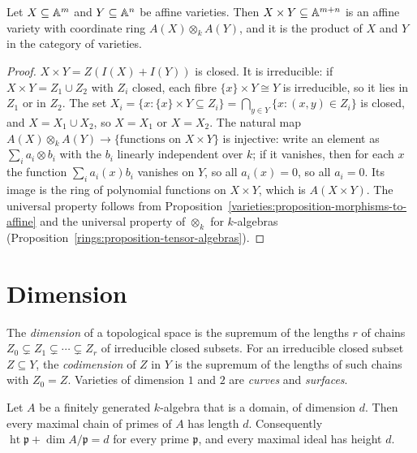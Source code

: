\begin{proposition}\label{varieties:proposition-products-affine}
Let $X \subseteq \mathbb{A}^m$ and $Y \subseteq \mathbb{A}^n$ be affine varieties. Then $X \times Y \subseteq \mathbb{A}^{m+n}$ is an affine variety with coordinate ring
$A(X) \otimes_k A(Y)$, and it is the product of $X$ and $Y$ in the category of varieties.
\end{proposition}

\begin{proof}
$X \times Y = Z(I(X) + I(Y))$ is closed. It is irreducible: if $X \times Y = Z_1 \cup Z_2$ with $Z_i$ closed, each fibre $\{x\} \times Y \cong Y$ is
irreducible, so it lies in $Z_1$ or in $Z_2$. The set $X_i = \{x : \{x\} \times Y \subseteq Z_i\} = \bigcap_{y \in Y}\{x : (x, y) \in Z_i\}$ is closed,
and $X = X_1 \cup X_2$, so $X = X_1$ or $X = X_2$. The natural map $A(X) \otimes_k A(Y) \to \{\text{functions on } X \times Y\}$ is injective:
write an element as $\sum_ia_i \otimes b_i$ with the $b_i$ linearly independent over $k$; if it vanishes, then for each $x$ the function
$\sum_ia_i(x)b_i$ vanishes on $Y$, so all $a_i(x) = 0$, so all $a_i = 0$. Its image is the ring of polynomial functions on $X \times Y$, which is
$A(X \times Y)$. The universal property follows from Proposition~\ref{varieties:proposition-morphisms-to-affine} and the universal property of
$\otimes_k$ for $k$-algebras (Proposition~\ref{rings:proposition-tensor-algebras}).
\end{proof}

\section{Dimension}\label{varieties:section-dimension}

\begin{definition}\label{varieties:definition-dimension}
The \emph{dimension} of a topological space is the supremum of the lengths $r$ of chains $Z_0 \subsetneq Z_1 \subsetneq \cdots \subsetneq Z_r$ of
irreducible closed subsets. For an irreducible closed subset $Z \subseteq Y$, the \emph{codimension} of $Z$ in $Y$ is the supremum of the lengths of
such chains with $Z_0 = Z$. Varieties of dimension $1$ and $2$ are \emph{curves} and \emph{surfaces}.
\end{definition}

\begin{lemma}\label{varieties:lemma-catenary}
Let $A$ be a finitely generated $k$-algebra that is a domain, of dimension $d$. Then every maximal chain of primes of $A$ has length $d$.
Consequently $\operatorname{ht}\mathfrak{p} + \dim A/\mathfrak{p} = d$ for every prime $\mathfrak{p}$, and every maximal ideal has height $d$.
\end{lemma}

